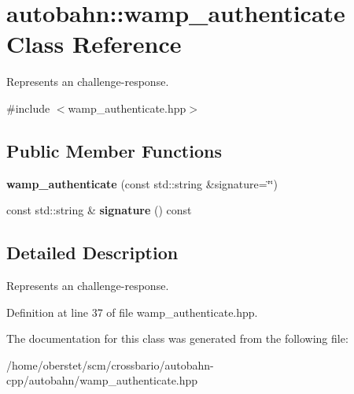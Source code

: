 \hypertarget{classautobahn_1_1wamp__authenticate}{}\section{autobahn\+:\+:wamp\+\_\+authenticate Class Reference}
\label{classautobahn_1_1wamp__authenticate}


Represents an challenge-\/response.  




{\ttfamily \#include $<$wamp\+\_\+authenticate.\+hpp$>$}

\subsection*{Public Member Functions}
\begin{DoxyCompactItemize}
\item 
{\bfseries wamp\+\_\+authenticate} (const std\+::string \&signature=\char`\"{}\char`\"{})\hypertarget{classautobahn_1_1wamp__authenticate_abda39a871140cf2bd473b4bb41b046d5}{}\label{classautobahn_1_1wamp__authenticate_abda39a871140cf2bd473b4bb41b046d5}

\item 
const std\+::string \& {\bfseries signature} () const \hypertarget{classautobahn_1_1wamp__authenticate_a36a0b889959777addcc0d96b43fe8c89}{}\label{classautobahn_1_1wamp__authenticate_a36a0b889959777addcc0d96b43fe8c89}

\end{DoxyCompactItemize}


\subsection{Detailed Description}
Represents an challenge-\/response. 

Definition at line 37 of file wamp\+\_\+authenticate.\+hpp.



The documentation for this class was generated from the following file\+:\begin{DoxyCompactItemize}
\item 
/home/oberstet/scm/crossbario/autobahn-\/cpp/autobahn/wamp\+\_\+authenticate.\+hpp\end{DoxyCompactItemize}
